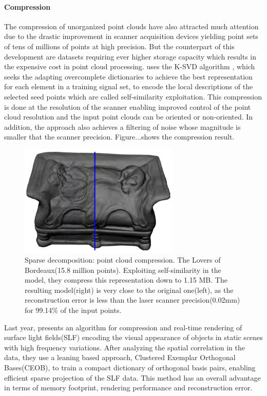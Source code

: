 \paragraph{Compression}

The compression of unorganized point clouds have also attracted much attention due to the drastic improvement in scanner acquisition devices yielding point sets of tens of millions of points at high precision. But the counterpart of this development are datasets requiring ever higher storage capacity which results in the expensive cost in point cloud processing. \cite{digne2014self} uses the K-SVD algorithm \cite{aharon2006svd}, which seeks the adapting overcomplete dictionaries to achieve the best representation for each element in a training signal set, to encode the local descriptions of the selected seed points which are called self-similarity exploitation. This compression is done at the resolution of the scanner enabling improved control of the point cloud resolution and the input point clouds can be oriented or non-oriented. In addition, the approach also achieves a filtering of noise whose magnitude is smaller that the scanner precision. Figure...shows the compression result.

\begin{figure}[ht]
  \centering
  \includegraphics[width=3in]{images/compression_learning}
  \caption{Sparse decomposition: point cloud compression\cite{digne2014self}. The Lovers of Bordeaux(15.8 million points). Exploiting self-similarity in the model, they compress this representation down to 1.15 MB. The resulting model(right) is very close to the original one(left), as the reconstruction error is less than the laser scanner precision(0.02mm) for 99.14\% of the input points.}
\end{figure}

Last year, \cite{miandji2013learning} presents an algorithm for compression and real-time rendering of surface light fields(SLF) encoding the visual appearance of objects in static scenes with high frequency variations. After analyzing the spatial correlation in the data, they use a leaning based approach, Clustered Exemplar Orthogonal Bases(CEOB), to train a compact dictionary of orthogonal basis pairs, enabling efficient sparse projection of the SLF data. This method has an overall advantage in terms of memory footprint, rendering performance and reconstruction error.

